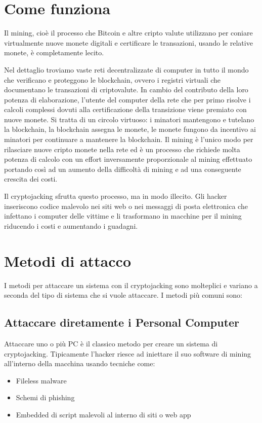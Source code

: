 \documentclass[12pt,a4paper]{article}
\begin{document}
\section{Come funziona}
Il mining, cioè il processo che Bitcoin e altre cripto valute utilizzano per
coniare virtualmente nuove monete digitali e certificare le transazioni, usando
le relative monete, è completamente lecito. 

Nel dettaglio troviamo vaste reti decentralizzate di computer in tutto il mondo
che verificano e proteggono le blockchain, ovvero i registri virtuali che
documentano le transazioni di criptovalute. In cambio del contributo della loro
potenza di elaborazione, l'utente del computer della rete che per primo risolve
i calcoli complessi dovuti alla certificazione della transizione viene premiato
con nuove monete. Si tratta di un circolo virtuoso: i minatori mantengono e
tutelano la blockchain, la blockchain assegna le monete, le monete fungono da
incentivo ai minatori per continuare a mantenere la blockchain. Il mining è
l'unico modo per rilasciare nuove cripto monete nella rete ed è un processo che
richiede molta potenza di calcolo con un effort inversamente proporzionale al
mining effettuato portando così ad un aumento della difficoltà di mining e ad
una conseguente crescita dei costi.

Il cryptojacking sfrutta questo processo, ma in modo illecito. Gli hacker
inseriscono codice malevolo nei siti web o nei messaggi di posta elettronica che
infettano i computer delle vittime e li trasformano in macchine per il mining 
riducendo i costi e aumentando i guadagni.

\section{Metodi di attacco}
I metodi per attaccare un sistema con il cryptojacking sono molteplici e
variano a seconda del tipo di sistema che si vuole attaccare. I metodi più
comuni sono:

\subsection{Attaccare diretamente i Personal Computer}
Attaccare uno o più PC è il classico metodo per creare un sistema di
cryptojacking. Tipicamente l'hacker riesce ad iniettare il suo software 
di mining all'interno della macchina usando tecniche come:
\begin{itemize}
    \item Fileless malware
    \item Schemi di phishing
    \item Embedded di script malevoli al interno di siti o web app
\end{itemize}
\end{document}
